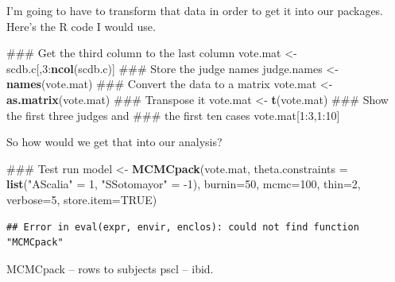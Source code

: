 \documentclass[12pt,twoside]{article}
\newenvironment{Shaded}{}{}
\newcommand{\KeywordTok}[1]{\textcolor[rgb]{0.00,0.44,0.13}{\textbf{{#1}}}}
\newcommand{\DataTypeTok}[1]{\textcolor[rgb]{0.56,0.13,0.00}{{#1}}}
\newcommand{\DecValTok}[1]{\textcolor[rgb]{0.25,0.63,0.44}{{#1}}}
\newcommand{\StringTok}[1]{\textcolor[rgb]{0.25,0.44,0.63}{{#1}}}
\newcommand{\OtherTok}[1]{\textcolor[rgb]{0.00,0.44,0.13}{{#1}}}
\newcommand{\NormalTok}[1]{{#1}}
\begin{document}
I'm going to have to transform that data in order to get it into our
packages. Here's the R code I would use.

\begin{Shaded}
\begin{Highlighting}[]
\NormalTok{### Get the third column to the last column}
\NormalTok{vote.mat <-}\StringTok{ }\NormalTok{scdb.c[,}\DecValTok{3}\NormalTok{:}\KeywordTok{ncol}\NormalTok{(scdb.c)]}
\NormalTok{### Store the judge names}
\NormalTok{judge.names <-}\StringTok{ }\KeywordTok{names}\NormalTok{(vote.mat)}
\NormalTok{### Convert the data to a matrix}
\NormalTok{vote.mat <-}\StringTok{ }\KeywordTok{as.matrix}\NormalTok{(vote.mat)}
\NormalTok{### Transpose it}
\NormalTok{vote.mat <-}\StringTok{ }\KeywordTok{t}\NormalTok{(vote.mat)}
\NormalTok{### Show the first three judges and}
\NormalTok{### the first ten cases}
\NormalTok{vote.mat[}\DecValTok{1}\NormalTok{:}\DecValTok{3}\NormalTok{,}\DecValTok{1}\NormalTok{:}\DecValTok{10}\NormalTok{]}
\end{Highlighting}
\end{Shaded}

So how would we get that into our analysis?

\begin{Shaded}
\begin{Highlighting}[]
\NormalTok{### Test run}
\NormalTok{model <-}\StringTok{ }\KeywordTok{MCMCpack}\NormalTok{(vote.mat,}
                  \DataTypeTok{theta.constraints =} \KeywordTok{list}\NormalTok{(}\StringTok{"AScalia"} \NormalTok{=}\StringTok{ }\DecValTok{1}\NormalTok{,}
                                           \StringTok{"SSotomayor"} \NormalTok{=}\StringTok{ }\NormalTok{-}\DecValTok{1}\NormalTok{),}
                  \DataTypeTok{burnin=}\DecValTok{50}\NormalTok{,}
                  \DataTypeTok{mcmc=}\DecValTok{100}\NormalTok{,}
                  \DataTypeTok{thin=}\DecValTok{2}\NormalTok{,}
                  \DataTypeTok{verbose=}\DecValTok{5}\NormalTok{,}
                        \DataTypeTok{store.item=}\OtherTok{TRUE}\NormalTok{)}
\end{Highlighting}
\end{Shaded}

\begin{verbatim}
## Error in eval(expr, envir, enclos): could not find function "MCMCpack"
\end{verbatim}

MCMCpack -- rows to subjects pscl -- ibid.

\hypertarget{refs}{}
\end{document}

